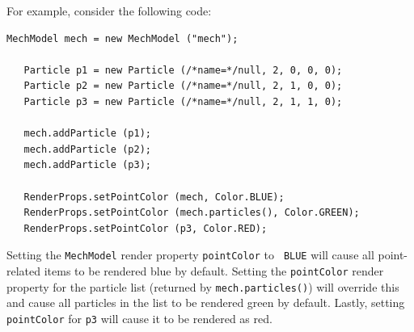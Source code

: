 For example, consider the following code:
%
\begin{lstlisting}[]
   MechModel mech = new MechModel ("mech");

   Particle p1 = new Particle (/*name=*/null, 2, 0, 0, 0);
   Particle p2 = new Particle (/*name=*/null, 2, 1, 0, 0);
   Particle p3 = new Particle (/*name=*/null, 2, 1, 1, 0);

   mech.addParticle (p1);
   mech.addParticle (p2);
   mech.addParticle (p3);

   RenderProps.setPointColor (mech, Color.BLUE);
   RenderProps.setPointColor (mech.particles(), Color.GREEN);
   RenderProps.setPointColor (p3, Color.RED);   
\end{lstlisting}
%
Setting the {\tt MechModel} render property {\tt pointColor} to {\tt
BLUE} will cause all point-related items to be rendered blue by
default. Setting the {\tt pointColor} render property for the particle
list (returned by {\tt mech.particles()}) will override this and cause
all particles in the list to be rendered green by default. Lastly,
setting {\tt pointColor} for {\tt p3} will cause it to be rendered as
red.

%



